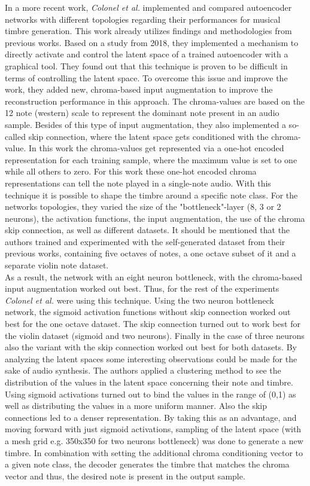 In a more recent work, \textit{Colonel et al.} implemented and compared autoencoder networks with different topologies regarding their performances for musical timbre generation. \cite{Colonel2020} This work already utilizes findings and methodologies from previous works. Based on a study from 2018, they implemented a mechanism to directly activate and control the latent space of a trained autoencoder with a graphical tool. They found out that this technique is proven to be difficult in terms of controlling the latent space. To overcome this issue and improve the work, they added new, chroma-based input augmentation to improve the reconstruction performance in this approach. The chroma-values are based on the 12 note (western) scale to represent the dominant note present in an audio sample. Besides of this type of input augmentation, they also implemented a so-called skip connection, where the latent space gets conditioned with the chroma-value. In this work the chroma-values get represented via a one-hot encoded representation for each training sample, where the maximum value is set to one while all others to zero. For this work these one-hot encoded chroma representations can tell the note played in a single-note audio. With this technique it is possible to shape the timbre around a specific note class. For the networks topologies, they varied the size of the "bottleneck"-layer (8, 3 or 2 neurons), the activation functions, the input augmentation, the use of the chroma skip connection, as well as different datasets. It should be mentioned that the authors trained and experimented with the self-generated dataset from their previous works, containing five octaves of notes, a one octave subset of it and a separate violin note dataset.\\
As a result, the network with an eight neuron bottleneck, with the chroma-based input augmentation worked out best. Thus, for the rest of the experiments \textit{Colonel et al.} were using this technique. Using the two neuron bottleneck network, the sigmoid activation functions without skip connection worked out best for the one octave dataset. The skip connection turned out to work best for the violin dataset (sigmoid and two neurons). Finally in the case of three neurons also the variant with the skip connection worked out best for both datasets. By analyzing the latent spaces some interesting observations could be made for the sake of audio synthesis. The authors applied a clustering method to see the distribution of the values in the latent space concerning their note and timbre. Using sigmoid activations turned out to bind the values in the range of (0,1) as well as distributing the values in a more uniform manner. Also the skip connections led to a denser representation. By taking this as an advantage, and moving forward with just sigmoid activations, sampling of the latent space (with a mesh grid e.g. 350x350 for two neurons bottleneck) was done to generate a new timbre. In combination with setting the additional chroma conditioning vector to a given note class, the decoder generates the timbre that matches the chroma vector and thus, the desired note is present in the output sample.\\

